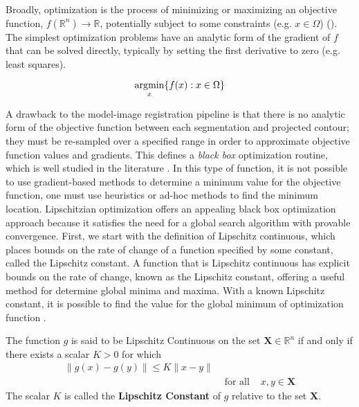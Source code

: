 Broadly, optimization is the process of minimizing or maximizing an objective function, $f(\mathbb{R}^{n}) \rightarrow \mathbb{R}$, potentially subject to some constraints (e.g. $x \in \Omega$) \cite{audetDerivativeFreeBlackboxOptimization2017} ().
The simplest optimization problems have an analytic form of the gradient of $f$ that can be solved directly, typically by setting the first derivative to zero (e.g. least squares).

\begin{equation}
    \operatorname*{\arg\!min}_{x}\{f(x) : x \in \Omega\}
    \label{eq:optim}
\end{equation}

A drawback to the model-image registration pipeline is that there is no analytic form of the objective function between each segmentation and projected contour; they must be re-sampled over a specified range in order to approximate objective function values and gradients.
This defines a \emph{black box} optimization routine, which is well studied in the literature \cite{audetDerivativeFreeBlackboxOptimization2017}.
In this type of function, it is not possible to use gradient-based methods to determine a minimum value for the objective function, one must use heuristics or ad-hoc methods to find the minimum location.
Lipschitzian optimization offers an appealing black box optimization approach because it satisfies the need for a global search algorithm with provable convergence.
First, we start with the definition of Lipschitz continuous, which places bounds on the rate of change of a function specified by some constant, called the Lipschitz constant.
A function that is Lipschitz continuous has explicit bounds on the rate of change, known as the Lipschitz constant, offering a useful method for determine global minima and maxima.
With a known Lipschitz constant, it is possible to find the value for the global minimum of optimization function \cite{dreisigmeyerDIRECTSEARCHMETHODS2007}.

\begin{mdframed}
    \begin{definition}
        The function $g$ is said to be Lipschitz Continuous on the set $\mathbf{X} \in \mathbb{R}^n$ if and only if there exists a scalar $K > 0$ for which
        \begin{equation*}
            \begin{aligned}
                \|g(x) - g(y)\| \le K\|x - y\|  & \\
                &\text{  for all  }& x,y \in \mathbf{X}
            \end{aligned}
        \end{equation*}
        The scalar $K$ is called the {\bf Lipschitz Constant} of $g$ relative to the set $\mathbf{X}$.
    \end{definition}
\end{mdframed}

